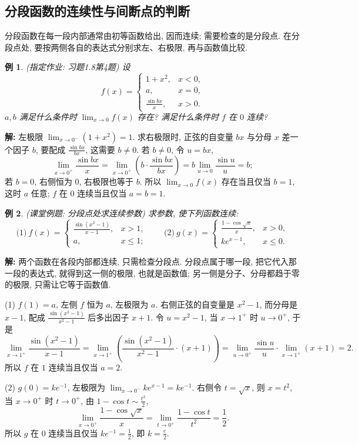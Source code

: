 \documentclass[UTF8,openany]{ctexbook}
\theoremstyle{chinesetextbook}
\newtheorem{example}{例}[section]
\newenvironment{cnsolution}{\par\indent\textbf{解:} \ignorespaces}{\par}
\begin{document}
\subsection{分段函数的连续性与间断点的判断}
分段函数在每一段内部通常由初等函数给出, 因而连续; 需要检查的是分段点. 在分段点处, 要按两侧各自的表达式分别求左、右极限, 再与函数值比较.
\begin{example}
\textnormal{(指定作业: 习题1.8第4题)} 设
\[
f(x)=\begin{cases}1+x^2,&x<0,\\a,&x=0,\\\frac{\sin bx}x,&x>0.\end{cases}
\]
$a,b$ 满足什么条件时 $\displaystyle\lim_{x\to0}f(x)$ 存在? 满足什么条件时 $f$ 在 $0$ 连续?
\end{example}
\begin{cnsolution}
左极限 $\displaystyle\lim_{x\to0^-}(1+x^2)=1$. 求右极限时, 正弦的自变量 $bx$ 与分母 $x$ 差一个因子 $b$, 要配成 $\displaystyle\frac{\sin bx}{bx}$, 这需要 $b\ne0$. 若 $b\ne0$, 令 $u=bx$,
\[
\lim_{x\to0^+}\frac{\sin bx}x=\lim_{x\to0^+}\left(b\cdot\frac{\sin bx}{bx}\right)=b\lim_{u\to0}\frac{\sin u}u=b;
\]
若 $b=0$, 右侧恒为 $0$, 右极限也等于 $b$. 所以 $\displaystyle\lim_{x\to0}f(x)$ 存在当且仅当 $b=1$, 这时 $a$ 任意; $f$ 在 $0$ 连续当且仅当 $a=b=1$.
\end{cnsolution}
\begin{example}
\textnormal{(课堂例题: 分段点处求连续参数)} 求参数, 使下列函数连续:
\[
\text{(1)}\ f(x)=\begin{cases}\frac{\sin(x^2-1)}{x-1},&x>1,\\a,&x\le1;\end{cases}\qquad\text{(2)}\ g(x)=\begin{cases}\frac{1-\cos\sqrt x}x,&x>0,\\ke^{x-1},&x\le0.\end{cases}
\]
\end{example}
\begin{cnsolution}
两个函数在各段内部都连续, 只需检查分段点. 分段点属于哪一段, 把它代入那一段的表达式, 就得到这一侧的极限, 也就是函数值; 另一侧是分子、分母都趋于零的极限, 只需让它等于函数值.

(1) $f(1)=a$, 左侧 $f$ 恒为 $a$, 左极限为 $a$. 右侧正弦的自变量是 $x^2-1$, 而分母是 $x-1$, 配成 $\displaystyle\frac{\sin(x^2-1)}{x^2-1}$ 后多出因子 $x+1$. 令 $u=x^2-1$, 当 $x\to1^+$ 时 $u\to0^+$, 于是
\[
\lim_{x\to1^+}\frac{\sin(x^2-1)}{x-1}=\lim_{x\to1^+}\left(\frac{\sin(x^2-1)}{x^2-1}\cdot(x+1)\right)=\lim_{u\to0^+}\frac{\sin u}u\cdot\lim_{x\to1^+}(x+1)=2.
\]
所以 $f$ 在 $1$ 连续当且仅当 $a=2$.

(2) $g(0)=ke^{-1}$, 左极限为 $\displaystyle\lim_{x\to0^-}ke^{x-1}=ke^{-1}$. 右侧令 $t=\sqrt x$, 则 $x=t^2$, 当 $x\to0^+$ 时 $t\to0^+$, 由 $\displaystyle1-\cos t\sim\frac{t^2}2$,
\[
\lim_{x\to0^+}\frac{1-\cos\sqrt x}x=\lim_{t\to0^+}\frac{1-\cos t}{t^2}=\frac12.
\]
所以 $g$ 在 $0$ 连续当且仅当 $\displaystyle ke^{-1}=\frac12$, 即 $\displaystyle k=\frac e2$.
\end{cnsolution}
\end{document}
